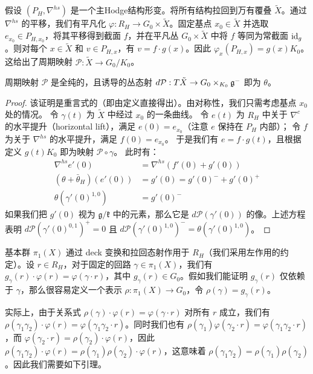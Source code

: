 假设 $(P_H, \nabla^{hs})$ 是一个主Hodge结构形变。将所有结构拉回到万有覆叠 $\tilde{X}$。通过 $\nabla^{hs}$ 的平移，我们有平凡化 $\varphi: R_H \to G_0 \times \tilde{X}$。固定基点 $x_0 \in \tilde{X}$ 并选取 $e_{x_0} \in P_{H, x_0}$，将其平移得到截面 $f$，并在平凡丛 $G_0 \times \tilde{X}$ 中将 $f$ 等同为常截面 $\mathrm{id}_g$。则对每个 $x \in \tilde{X}$ 和 $v \in P_{H,x}$，有 $v = f \cdot g(x)$。因此 $\varphi_x(P_{H,x}) = g(x)K_0$。这给出了周期映射 $\mathcal{P}: \tilde{X} \to G_0/K_0$。

\begin{proposition}\label{periodholomorphic}
周期映射 $\mathcal{P}$ 是全纯的，且诱导的丛态射 $d\mathcal{P}: T\tilde{X} \to G_0 \times_{K_0} \mathfrak{g}^-$ 即为 $\theta$。
\end{proposition}
\begin{proof}
该证明是重言式的（即由定义直接得出）。由对称性，我们只需考虑基点 $x_0$ 处的情况。
令 $\gamma(t)$ 为 $\tilde{X}$ 中经过 $x_0$ 的一条曲线。
令 $e(t)$ 为 $R_H$ 中关于 $\nabla^c$ 的水平提升（horizontal lift），满足 $e(0) = e_{x_0}$（注意 $e$ 保持在 $P_H$ 内部）；
令 $f$ 为关于 $\nabla^{hs}$ 的水平提升，满足 $f(0) = e_{x_0}$。
于是我们有 $e = f \cdot g(t)$，且根据定义 $g(t)K_0$ 即为映射 $\mathcal{P} \circ \gamma$。
此时有：
\[
\begin{aligned}
\nabla^{hs}e'(0) &= \nabla^{hs}(f'(0) + g'(0)) \\
(\theta + \bar{\theta}_H)(e'(0)) &= g'(0) = g'(0)^- + g'(0)^+ \\
\theta(\gamma'(0)^{1,0}) &= g'(0)^-
\end{aligned}
\]
如果我们把 $g'(0)$ 视为 $\mathfrak{g}/\mathfrak{k}$ 中的元素，那么它是 $d\mathcal{P}(\gamma'(0))$ 的像。上述方程表明 $d\mathcal{P}(\gamma'(0)^{0,1})^+ = 0$ 且 $d\mathcal{P}(\gamma'(0)^{1,0})^- = \theta(\gamma'(0)^{1,0})$。
\end{proof}

基本群 $\pi_1(X)$ 通过 deck 变换和拉回态射作用于 $R_H$（我们采用左作用的约定）。设 $r \in R_H$，对于固定的回路 $\gamma \in \pi_1(X)$，我们有 $g_\gamma(r) \cdot \varphi(r) = \varphi(\gamma \cdot r)$，其中 $g_\gamma(r) \in G_0$。假如我们能证明 $g_\gamma(r)$ 仅依赖于 $\gamma$，那么很容易定义一个表示 $\rho: \pi_1(X) \to G_0$，令 $\rho(\gamma) = g_\gamma(r)$。

实际上，由于关系式 $\rho(\gamma) \cdot \varphi(r) = \varphi(\gamma \cdot r)$ 对所有 $r$ 成立，我们有 $\rho(\gamma_1\gamma_2) \cdot \varphi(r) = \varphi(\gamma_1\gamma_2 \cdot r)$。同时我们也有 $\rho(\gamma_1)\varphi(\gamma_2 \cdot r) = \varphi(\gamma_1\gamma_2 \cdot r)$，而 $\varphi(\gamma_2 \cdot r) = \rho(\gamma_2) \cdot \varphi(r)$，因此 $\rho(\gamma_1\gamma_2) \cdot \varphi(r) = \rho(\gamma_1)\rho(\gamma_2) \cdot \varphi(r)$，这意味着 $\rho(\gamma_1\gamma_2) = \rho(\gamma_1)\rho(\gamma_2)$。因此我们需要如下引理。

